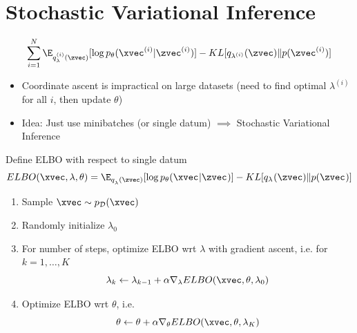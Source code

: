 \section{Stochastic Variational Inference}


\begin{frame}
  \begin{center}
   \end{center}   
   
\[ \sum_{i=1}^N \E_{q_\lambda^{(i)}(\zvec)}[\log  p_\theta(\xvec^{(i)} | \zvec^{(i)}) ] - KL[q_{\lambda^{(i)}}(\zvec) \Vert p(\zvec^{(i)})] \]

\begin{itemize}
\item Coordinate ascent is impractical on large datasets (need to find optimal $\lambda^{(i)}$ for all $i$, then update $\theta$)
\item Idea: Just use minibatches (or single datum) $\implies$ Stochastic Variational Inference
\end{itemize}
\end{frame}

\begin{frame}
  \begin{center}
   \end{center}   
Define ELBO with respect to single datum
\[ ELBO(\xvec, \lambda, \theta) = \E_{q_\lambda^{}(\zvec)}[\log  p_\theta(\xvec^{} | \zvec^{}) ] - KL[q_{\lambda^{}}(\zvec) \Vert p(\zvec^{})] \]

\begin{enumerate}
\item Sample $\xvec \sim p_\mathcal{D}(\xvec)$
\item Randomly initialize $\lambda_0$ 
\item For number of steps, optimize ELBO wrt $\lambda$ with gradient ascent, i.e.
for $k = 1, \dots, K$
\[ \lambda_{k} \leftarrow \lambda_{k-1} + \alpha  \nabla_\lambda ELBO(\xvec, \theta, \lambda_0)\]
\item Optimize ELBO wrt $\theta$, i.e.
\[ \theta \leftarrow \theta + \alpha \nabla_\theta ELBO(\xvec, \theta, \lambda_K)\]
\end{enumerate}
\end{frame}

